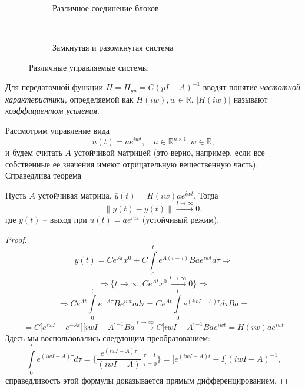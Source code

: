 \begin{figure}[h]
	\centering
	
	\begin{subfigure}[t]{0.4\textwidth}
	\caption{Различное соединение блоков}\label{ch14u1}
	\end{subfigure}
	~ ~ ~ ~               
	\begin{subfigure}[t]{0.4\textwidth}
	\caption{Замкнутая и разомкнутая система}\label{ch14u2}
	\end{subfigure}
	
	\caption{Различные управляемые системы}\label{ch14u}
\end{figure}

Для передаточной функции $ H = H_{yu}   = C(pI - A)^{-1}$ вводят понятие \textit{частотной характеристики,} определяемой как $H(iw), w \in \ensuremath{\mathbb{R}}.$ $|H(iw)|$ называют \textit{коэффициентом усиления}.

Рассмотрим управление вида 
$$ u(t) = a e^{iwt}, \quad a \in \ensuremath{\mathbb{R}}^{n\times 1}, w \in \ensuremath{\mathbb{R}},$$
и будем считать $A$ устойчивой матрицей (это верно, например, если все собственные ее значения имеют отрицательную вещественную часть). Справедлива теорема
\begin{theorem}
Пусть $A$ устойчивая матрица, $\bar y(t) = H(iw)a e^{iwt}$. Тогда 
$$\left\lVert y(t) - \bar y(t) \right\rVert \stackrel{t \rightarrow \infty }{\longrightarrow} 0,$$
где $y(t)$ -- выход при $ u(t) = a e^{iwt}$ (устойчивый режим).

\end{theorem}
\begin{proof}

$$ y(t) = C e^{At}x^0 + C\int\limits_0^t e^{A(t-\tau)}B a e^{iwt} d\tau \Rightarrow$$
$$ \Rightarrow \big \{ t \rightarrow \infty , C e^{At}x^0  \stackrel{t \rightarrow \infty }{\longrightarrow} 0\}  \Rightarrow$$
$$ \Rightarrow C e^{At}  \int\limits_0^t e^{-A\tau}B e^{iwt} a d\tau = C e^{At}  \int\limits_0^t e^{(iwI -A)\tau} d\tau B  a =$$
$$=  C \big [ e^{iwI} - e^{-At}  \big ] \big [ iwI - A \big ] ^{-1} Ba  \stackrel{t \rightarrow \infty }{\longrightarrow} C \big [ iwI - A \big ]^{-1} Ba e^{iwt}= H(iw) a e^{iwt}$$
Здесь мы воспользовались следующим преобразованием:
$$ \int\limits_0^t e^{(iwI -A)\tau} d\tau =\Bigg \{\frac{e^{(iwI - A)\tau}}{(iwI - A)} \Bigg |_{\tau =0 }^{\tau = t} \Bigg \}=\big  [ e^{(iwI - A)t} - I \big] (iwI - A)^{-1},  $$
справедливость этой формулы доказывается прямым дифференцированием. \end{proof}

